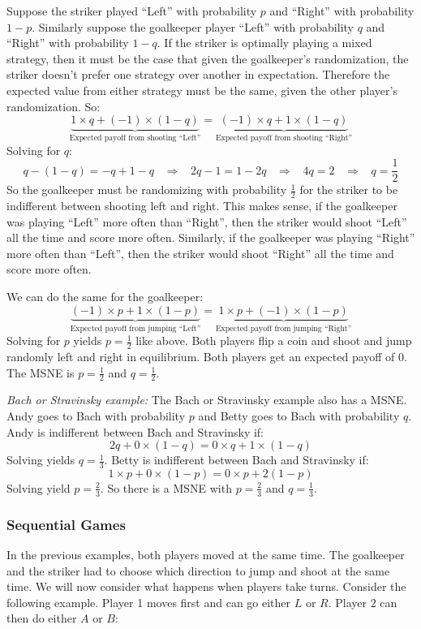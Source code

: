 \documentclass{article}
\begin{document}
Suppose the striker played ``Left'' with probability $p$ and ``Right'' with probability $1-p$. Similarly suppose the goalkeeper player ``Left'' with probability $q$ and ``Right'' with probability $1-q$. If the striker is optimally playing a mixed strategy, then it must be the case that given the goalkeeper's randomization, the striker doesn't prefer one strategy over another in expectation. Therefore the expected value from either strategy must be the same, given the other player's randomization. So:
\[
  \underbrace{1\times q + \left( -1 \right)\times \left( 1-q \right)}_{\text{Expected payoff from shooting ``Left''}}=
  \underbrace{\left( -1 \right)\times q + 1\times \left( 1-q \right)}_{\text{Expected payoff from shooting ``Right''}}
\]
Solving for $q$:
\[q-\left( 1-q \right)=-q + 1-q \;\;\;\Longrightarrow\;\;\;
  2q-1=1-2q\;\;\;\Longrightarrow\;\;\;
  4q=2\;\;\;\Longrightarrow\;\;\;
  q=\frac{1}{2}
\]
So the goalkeeper must be randomizing with probability $\frac{1}{2}$ for the striker to be indifferent between shooting left and right. This makes sense, if the goalkeeper was playing ``Left'' more often than ``Right'', then the striker would shoot ``Left'' all the time and score more often. Similarly, if the goalkeeper was playing ``Right'' more often than ``Left'', then the striker would shoot ``Right'' all the time and score more often.

We can do the same for the goalkeeper:
\[
  \underbrace{\left( -1 \right)\times p + 1\times \left( 1-p \right)}_{\text{Expected payoff from jumping ``Left''}}=
  \underbrace{1\times p + \left( -1 \right)\times \left( 1-p \right)}_{\text{Expected payoff from jumping ``Right''}}
\]
Solving for $p$ yields $p=\frac{1}{2}$ like above. Both players flip a coin and shoot and jump randomly left and right in equilibrium. Both players get an expected payoff of 0. The MSNE is $p=\frac{1}{2}$ and $q=\frac{1}{2}$.
\bigskip
\par\noindent\emph{Bach or Stravinsky example:}
The Bach or Stravinsky example also has a MSNE. Andy goes to Bach with probability $p$ and Betty goes to Bach with probability $q$. Andy is indifferent between Bach and Stravinsky if:
\[
  2q + 0\times \left( 1-q \right)=0\times q + 1\times \left( 1-q \right)
\]
Solving yields $q=\frac{1}{3}$. Betty is indifferent between Bach and Stravinsky if:
\[
  1\times p + 0\times \left( 1-p \right)=0\times p + 2\left( 1-p \right)
\]
Solving yield $p=\frac{2}{3}$. So there is a MSNE with $p=\frac{2}{3}$ and $q=\frac{1}{3}$.

\subsubsection*{Sequential Games}
In the previous examples, both players moved at the same time. The goalkeeper and the striker had to choose which direction to jump and shoot at the same time. We will now consider what happens when players take turns. Consider the following example. Player 1 moves first and can go either $L$  or $R$. Player 2 can then do either $A$ or $B$:
\end{document}
